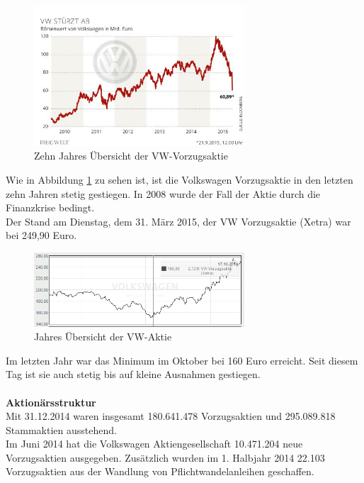 \documentclass[12pt]{article}
\begin{document}
\begin{figure}[!h]
\centering
\includegraphics[width=0.7\textwidth]{images/finanzen2015}
\caption{Zehn Jahres Übersicht der VW-Vorzugsaktie \cite{aktienfotos}}
\label{fig:vwaktie1}
\end{figure}\FloatBarrier
\noindent
Wie in Abbildung \ref{fig:vwaktie1} zu sehen ist, ist die Volkswagen Vorzugsaktie in den letzten zehn Jahren stetig gestiegen. In 2008 wurde der Fall der Aktie durch die Finanzkrise bedingt.\\
Der Stand am Dienstag, dem 31. März 2015, der VW Vorzugsaktie (Xetra) war bei 249,90 Euro.
\begin{figure}[!h]
\centering
\includegraphics[width=0.7\textwidth]{images/finanzen20151}
\caption{Jahres Übersicht der VW-Aktie \cite{aktienfotos}}
\label{fig:vwaktie3}
\end{figure}\FloatBarrier
\noindent
Im letzten Jahr war das Minimum im Oktober bei 160 Euro erreicht. Seit diesem Tag ist sie auch stetig bis auf kleine Ausnahmen gestiegen. \\\\
\textbf{Aktionärsstruktur}\\
Mit 31.12.2014 waren insgesamt 180.641.478 Vorzugsaktien und 295.089.818 Stammaktien ausstehend.\\
Im Juni 2014 hat die Volkswagen Aktiengesellschaft 10.471.204 neue Vorzugsaktien ausgegeben. Zusätzlich wurden im 1. Halbjahr 2014 22.103 Vorzugsaktien aus der Wandlung von Pflichtwandelanleihen geschaffen.
\cite{aktionaersstruktur} \\ \\
\end{document}
